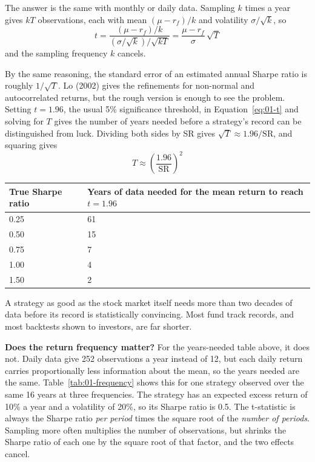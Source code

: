 The answer is the same with monthly or daily data. Sampling $k$ times a year gives $kT$ observations, each with mean $(\mu - r_f)/k$ and volatility $\sigma/\sqrt{k}$, so
\begin{equation}
  t = \frac{(\mu - r_f)/k}{(\sigma/\sqrt{k})/\sqrt{kT}} = \frac{\mu - r_f}{\sigma}\,\sqrt{T} \nonumber
\end{equation}
and the sampling frequency $k$ cancels.

By the same reasoning, the standard error of an estimated annual Sharpe ratio is roughly $1/\sqrt{T}$. Lo (2002) gives the refinements for non-normal and autocorrelated returns, but the rough version is enough to see the problem. Setting $t = 1.96$, the usual 5\% significance threshold, in Equation~\eqref{eq:01-t} and solving for $T$ gives the number of years needed before a strategy's record can be distinguished from luck. Dividing both sides by SR gives $\sqrt{T} \approx 1.96/\mathrm{SR}$, and squaring gives
\begin{equation}
  T \approx \left(\frac{1.96}{\mathrm{SR}}\right)^2
  \label{eq:01-T}
\end{equation}

\begin{center}
\small
\begin{tabular}{@{}ll@{}}
\toprule
True Sharpe ratio & Years of data needed for the mean return to reach $t = 1.96$ \\
\midrule
0.25 & 61 \\
0.50 & 15 \\
0.75 & 7 \\
1.00 & 4 \\
1.50 & 2 \\
\bottomrule
\end{tabular}
\end{center}

A strategy as good as the stock market itself needs more than two decades of data before its record is statistically convincing. Most fund track records, and most backtests shown to investors, are far shorter.

\textbf{Does the return frequency matter?} For the years-needed table above, it does not. Daily data give 252 observations a year instead of 12, but each daily return carries proportionally less information about the mean, so the years needed are the same. Table~\ref{tab:01-frequency} shows this for one strategy observed over the same 16 years at three frequencies. The strategy has an expected excess return of 10\% a year and a volatility of 20\%, so its Sharpe ratio is 0.5. The t-statistic is always the Sharpe ratio \emph{per period} times the square root of the \emph{number of periods}. Sampling more often multiplies the number of observations, but shrinks the Sharpe ratio of each one by the square root of that factor, and the two effects cancel.

